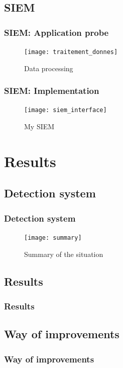 \documentclass[10pt, svgnames, compress, red]{beamer}
\begin{document}
\subsection{SIEM}
\begin{frame}
  \frametitle{SIEM: Application probe}
  \begin{figure}[h]
    \centering
    \texttt{[image: traitement\_donnes]}
    \caption{Data processing}
    \label{fig:data}
  \end{figure}
\end{frame}

\begin{frame}
  \frametitle{SIEM: Implementation}
  \begin{figure}[h]
    \centering
    \texttt{[image: siem\_interface]}
    \caption{My SIEM}
  \end{figure}
\end{frame}

\section{Results}

\subsection{Detection system}
\begin{frame}
  \frametitle{Detection system}
  \begin{figure}[h]
    \centering
    \texttt{[image: summary]}
    \caption{Summary of the situation}
  \end{figure}
\end{frame}


\subsection{Results}
\begin{frame}
  \frametitle{Results}

\end{frame}

\subsection{Way of improvements}
\begin{frame}
  \frametitle{Way of improvements}

\end{frame}
\end{document}
